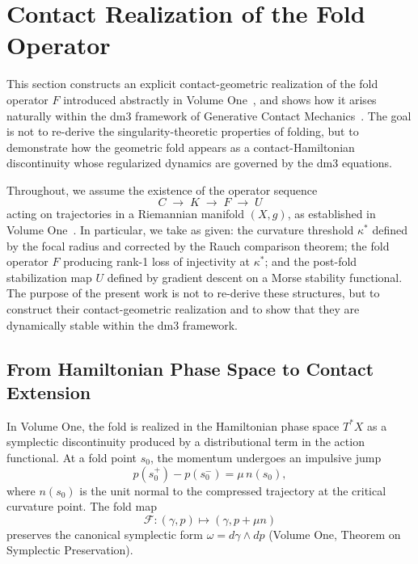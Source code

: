 
\section{Contact Realization of the Fold Operator}
\label{sec:contact-realization}

This section constructs an explicit contact-geometric realization
of the fold operator $F$ introduced abstractly in Volume
One~\cite{PrincipiaI}, and shows how it arises naturally within
the dm3 framework of Generative Contact
Mechanics~\cite{Paper1,Paper2}. The goal is not to re-derive
the singularity-theoretic properties of folding, but to demonstrate
how the geometric fold appears as a contact-Hamiltonian
discontinuity whose regularized dynamics are governed by the dm3
equations.

Throughout, we assume the existence of the operator sequence
\[
  C \;\to\; K \;\to\; F \;\to\; U
\]
acting on trajectories in a Riemannian manifold $(X,g)$, as
established in Volume One~\cite{PrincipiaI}. In particular, we
take as given: the curvature threshold $\kappa^*$ defined by the
focal radius and corrected by the Rauch comparison theorem; the
fold operator $F$ producing rank-1 loss of injectivity at
$\kappa^*$; and the post-fold stabilization map $U$ defined by
gradient descent on a Morse stability functional. The purpose of
the present work is not to re-derive these structures, but to
construct their contact-geometric realization and to show that
they are dynamically stable within the dm3 framework.

\subsection{From Hamiltonian Phase Space to Contact Extension}
\label{subsec:contactification}

In Volume One, the fold is realized in the Hamiltonian phase
space $T^*X$ as a symplectic discontinuity produced by a
distributional term in the action functional. At a fold point
$s_0$, the momentum undergoes an impulsive jump
\[
  p(s_0^+) - p(s_0^-) = \mu\,n(s_0),
\]
where $n(s_0)$ is the unit normal to the compressed trajectory
at the critical curvature point. The fold map
\[
  \mathcal{F} : (\gamma,p) \mapsto (\gamma, p + \mu n)
\]
preserves the canonical symplectic form $\omega = d\gamma\wedge dp$
(Volume One, Theorem on Symplectic Preservation).

